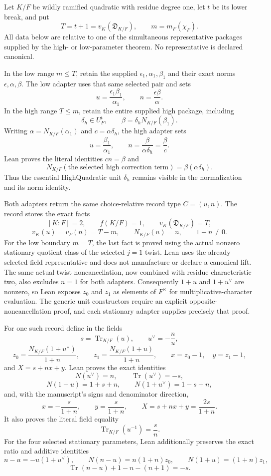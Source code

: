 \begin{theorem}
\label{mod:cases-wildquadratic-commoncorrection}
Let $K/F$ be wildly ramified quadratic with residue degree one, let $t$ be
its lower break, and put
\[
 T=t+1=v_K(\mathfrak D_{K/F}),\qquad m=m_F(\chi_F).
\]
All data below are relative to one of the simultaneous representative
packages supplied by the high- or low-parameter theorem.  No representative
is declared canonical.

In the low range $m\leq T$, retain the supplied
$\epsilon _1,\alpha _1,\beta _1$ and their exact norms
$\epsilon,\alpha,\beta$.  The low adapter uses that same selected pair and
sets
\[
 u=\frac{\epsilon _1\beta _1}{\alpha _1},
 \qquad n=\frac{\epsilon\beta}{\alpha}.
\]
In the high range $T\leq m$, retain the entire supplied high package,
including
\[
 \delta_h\in U_F^t,
 \qquad \beta=\delta_hN_{K/F}(\beta _1).
\]
Writing $\alpha=N_{K/F}(\alpha _1)$ and $c=\alpha\delta_h$, the high adapter
sets
\[
 u=\frac{\beta _1}{\alpha _1},
 \qquad n=\frac{\beta}{\alpha\delta_h}=\frac\beta c.
\]
Lean proves the literal identities $cn=\beta$ and
\[
 N_{K/F}(\text{the selected high correction term})
   =\beta(\alpha\delta_h).
\]
Thus the essential HighQuadratic unit $\delta_h$ remains visible in the
normalization and its norm identity.

Both adapters return the same choice-relative record type $C=(u,n)$.  The
record stores the exact facts
\[
 [K:F]=2,\qquad f(K/F)=1,\qquad
 v_K(\mathfrak D_{K/F})=T,
\]
\[
 v_K(u)=v_F(n)=T-m,\qquad N_{K/F}(u)=n,\qquad 1+n\ne0.
\]
For the low boundary $m=T$, the last fact is proved using the actual nonzero
stationary quotient class of the selected $j=1$ twist.  Lean uses the
already selected field representative and does not manufacture or declare a
canonical lift.
The same actual twist noncancellation, now combined with residue
characteristic two, also excludes $n=1$ for both adapters.  Consequently
$1+u$ and $1+u^\vee$ are nonzero, so Lean exposes $z_0$ and $z_1$ as
elements of $F^\times$ for multiplicative-character evaluation.  The generic
unit constructors require an explicit opposite-noncancellation proof, and
each stationary adapter supplies precisely that proof.

For one such record define in the fields
\[
 s=\operatorname{Tr}_{K/F}(u),\qquad
 u^\vee=-\frac n u,
\]
\[
 z_0=\frac{N_{K/F}(1+u^\vee)}{1+n},\qquad
 z_1=\frac{N_{K/F}(1+u)}{1+n},
 \qquad x=z_0-1,\quad y=z_1-1,
\]
and $X=s+nx+y$.  Lean proves the exact identities
\[
 N(u^\vee)=n,\qquad \operatorname{Tr}(u^\vee)=-s,
\]
\[
 N(1+u)=1+s+n,\qquad N(1+u^\vee)=1-s+n,
\]
and, with the manuscript's signs and denominator direction,
\begin{equation}\label{eq:lean-wild-quadratic-common-X}
 x=-\frac{s}{1+n},\qquad
 y=\frac{s}{1+n},\qquad
 X=s+nx+y=\frac{2s}{1+n}.
\end{equation}
It also proves the literal field equality
\[
 \operatorname{Tr}_{K/F}(u^{-1})=\frac{s}{n}.
\]
For the four selected stationary parameters, Lean additionally preserves
the exact ratio and additive identities
\[
 n-u=-u(1+u^\vee),\qquad
 N(n-u)=n(1+n)z_0,\qquad N(1+u)=(1+n)z_1,
\]
\[
 \operatorname{Tr}(n-u)+1-n-(n+1)=-s.
\]


\end{theorem}
